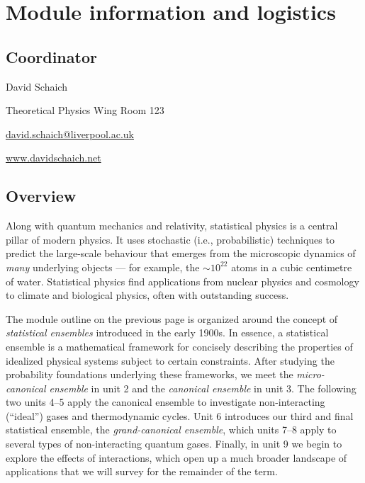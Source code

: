 \newcommand{\thisunit}{MATH327 information}
\newcommand{\moddate}{Last modified 26 Jan.~2023}
\setcounter{section}{0}
{}
\section*{Module information and logistics}

\subsection*{Coordinator}
\begin{description}
  \setlength{\itemsep}{1pt}
  \setlength{\parskip}{0pt}
  \setlength{\parsep}{0pt}
  \item[\qquad] David Schaich
  \item[\qquad] Theoretical Physics Wing Room 123
  \item[\qquad] \href{mailto:david.schaich@liverpool.ac.uk}{david.schaich@liverpool.ac.uk}
  \item[\qquad] \href{http://www.davidschaich.net}{www.davidschaich.net}
\end{description}



\subsection*{Overview}
Along with quantum mechanics and relativity, statistical physics is a central pillar of modern physics.
It uses stochastic (i.e., probabilistic) techniques to predict the large-scale behaviour that emerges from the microscopic dynamics of \emph{many} underlying objects --- for example, the $\sim$$10^{22}$ atoms in a cubic centimetre of water.
Statistical physics find applications from nuclear physics and cosmology to climate and biological physics, often with outstanding success.

The module outline on the previous page is organized around the concept of \textit{statistical ensembles} introduced in the early 1900s.
In essence, a statistical ensemble is a mathematical framework for concisely describing the properties of idealized physical systems subject to certain constraints.
After studying the probability foundations underlying these frameworks, we meet the \textit{micro-canonical ensemble} in unit 2 and the \textit{canonical ensemble} in unit 3.
The following two units 4--5 apply the canonical ensemble to investigate non-interacting (``ideal'') gases and thermodynamic cycles.
Unit 6 introduces our third and final statistical ensemble, the \textit{grand-canonical ensemble}, which units 7--8 apply to several types of non-interacting quantum gases.
Finally, in unit 9 we begin to explore the effects of interactions, which open up a much broader landscape of applications that we will survey for the remainder of the term.



